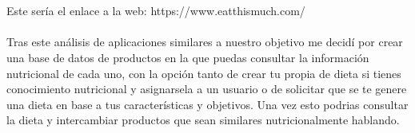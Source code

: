 \\\\
Este sería el enlace a la web: https://www.eatthismuch.com/
\\\\
Tras este análisis de aplicaciones similares a nuestro objetivo me decidí por crear una base de datos de productos en la que puedas consultar
la información nutricional de cada uno, con la opción tanto de crear tu propia de dieta si tienes conocimiento nutricional y asignarsela a un usuario o de solicitar que 
se te genere una dieta en base a tus características y objetivos. Una vez esto podrias consultar la dieta y intercambiar productos que sean similares 
nutricionalmente hablando.

